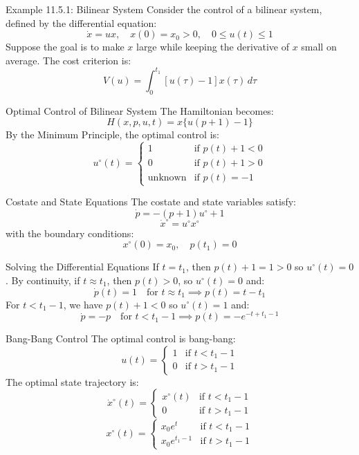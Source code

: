 \documentclass[10pt]{beamer}
\begin{document}
\begin{frame}[fragile]{Example 11.5.1: Bilinear System}
  Consider the control of a bilinear system, defined by the differential equation:
  \[
  \dot{x} = ux, \quad x(0) = x_0 > 0, \quad 0 \le u(t) \le 1
  \]
  Suppose the goal is to make \( x \) large while keeping the derivative of \( x \) small on average. The cost criterion is:
  \[
  V(u) = \int_0^{t_1} [u(\tau) - 1]x(\tau) \, d\tau
  \]
\end{frame}
  
\begin{frame}[fragile]{Optimal Control of Bilinear System}
  The Hamiltonian becomes:
  \[
  H(x, p, u, t) = x \{ u(p + 1) - 1 \}
  \]
  By the Minimum Principle, the optimal control is:
  \[
  u^\circ(t) = \begin{cases}
  1 & \text{if } p(t) + 1 < 0 \\
  0 & \text{if } p(t) + 1 > 0 \\
  \text{unknown} & \text{if } p(t) = -1
  \end{cases}
  \]
\end{frame}
  
\begin{frame}[fragile]{Costate and State Equations}
  The costate and state variables satisfy:
  \[
  \dot{p} = -(p + 1)u^\circ + 1
  \]
  \[
  \dot{x}^\circ = u^\circ x^\circ
  \]
  with the boundary conditions:
  \[
  x^\circ(0) = x_0, \quad p(t_1) = 0
  \]
\end{frame}
  
\begin{frame}[fragile]{Solving the Differential Equations}
  If \( t = t_1 \), then \( p(t) + 1 = 1 > 0 \) so \( u^\circ(t) = 0 \). By continuity, if \( t \approx t_1 \), then \( p(t) > 0 \), so \( u^\circ(t) = 0 \) and:
  \[
  \dot{p}(t) = 1 \quad \text{for } t \approx t_1 \implies p(t) = t - t_1
  \]
  For \( t < t_1 - 1 \), we have \( p(t) + 1 < 0 \) so \( u^\circ(t) = 1 \) and:
  \[
  \dot{p} = -p \quad \text{for } t < t_1 - 1 \implies p(t) = -e^{-t + t_1 - 1}
  \]
\end{frame}
  
\begin{frame}[fragile]{Bang-Bang Control}
  The optimal control is bang-bang:
  \[
  u(t) = \begin{cases}
  1 & \text{if } t < t_1 - 1 \\
  0 & \text{if } t > t_1 - 1
  \end{cases}
  \]
  The optimal state trajectory is:
  \[
  \dot{x}^\circ(t) = \begin{cases}
  x^\circ(t) & \text{if } t < t_1 - 1 \\
  0 & \text{if } t > t_1 - 1
  \end{cases}
  \]
  \[
  x^\circ(t) = \begin{cases}
  x_0 e^t & \text{if } t < t_1 - 1 \\
  x_0 e^{t_1 - 1} & \text{if } t > t_1 - 1
  \end{cases}
  \]
\end{frame}
  
\end{document}
